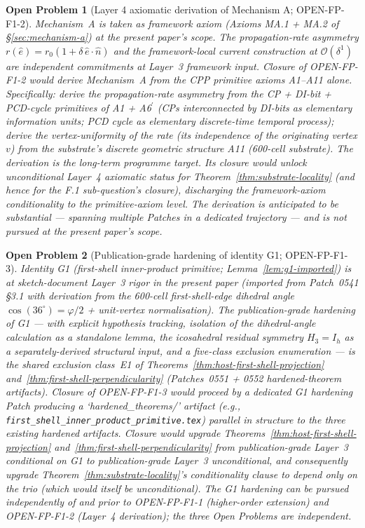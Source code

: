 \documentclass[11pt,letterpaper]{article}
\newtheorem{openproblem}{Open Problem}
\newcommand{\phig}{\varphi}
\newcommand{\bigO}[1]{\mathcal{O}(#1)}
\begin{document}
\begin{openproblem}[Layer 4 axiomatic derivation of Mechanism A; OPEN-FP-F1-2]
\label{op:layer4-mechanism-a}
Mechanism~A is taken as framework axiom (Axioms MA.1 + MA.2 of \S\ref{sec:mechanism-a}) at the present paper's scope. The propagation-rate asymmetry $r(\hat{e}) = r_0(1 + \delta\,\hat{e}\cdot\hat{n})$ and the framework-local current construction at $\bigO{\delta^1}$ are independent commitments at Layer~3 framework input. Closure of OPEN-FP-F1-2 would derive Mechanism~A from the CPP primitive axioms A1--A11 alone. Specifically: derive the propagation-rate asymmetry from the CP + DI-bit + PCD-cycle primitives of A1 + A6$^{\prime}$ (CPs interconnected by DI-bits as elementary information units; PCD cycle as elementary discrete-time temporal process); derive the vertex-uniformity of the rate (its independence of the originating vertex $v$) from the substrate's discrete geometric structure A11 (600-cell substrate). The derivation is the long-term programme target. Its closure would unlock unconditional Layer~4 axiomatic status for Theorem~\ref{thm:substrate-locality} (and hence for the F.1 sub-question's closure), discharging the framework-axiom conditionality to the primitive-axiom level. The derivation is anticipated to be substantial --- spanning multiple Patches in a dedicated trajectory --- and is not pursued at the present paper's scope.
\end{openproblem}

\begin{openproblem}[Publication-grade hardening of identity G1; OPEN-FP-F1-3]
\label{op:g1-hardening}
Identity G1 (first-shell inner-product primitive; Lemma~\ref{lem:g1-imported}) is at sketch-document Layer~3 rigor in the present paper (imported from Patch~0541 \S3.1 with derivation from the 600-cell first-shell-edge dihedral angle $\cos(36^\circ) = \phig/2$ + unit-vertex normalisation). The publication-grade hardening of G1 --- with explicit hypothesis tracking, isolation of the dihedral-angle calculation as a standalone lemma, the icosahedral residual symmetry $H_3 = I_h$ as a separately-derived structural input, and a five-class exclusion enumeration --- is the shared exclusion class~E1 of Theorems~\ref{thm:host-first-shell-projection} and~\ref{thm:first-shell-perpendicularity} (Patches~0551 + 0552 hardened-theorem artifacts). Closure of OPEN-FP-F1-3 would proceed by a dedicated G1 hardening Patch producing a `hardened\_theorems/' artifact (e.g., \texttt{first\_shell\_inner\_product\_primitive.tex}) parallel in structure to the three existing hardened artifacts. Closure would upgrade Theorems~\ref{thm:host-first-shell-projection} and~\ref{thm:first-shell-perpendicularity} from \emph{publication-grade Layer~3 conditional on G1} to \emph{publication-grade Layer~3 unconditional}, and consequently upgrade Theorem~\ref{thm:substrate-locality}'s conditionality clause to depend only on the trio (which would itself be unconditional). The G1 hardening can be pursued independently of and prior to OPEN-FP-F1-1 (higher-order extension) and OPEN-FP-F1-2 (Layer~4 derivation); the three Open Problems are independent.
\end{openproblem}
\end{document}
